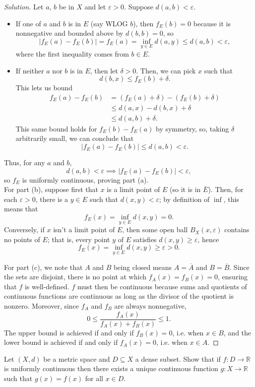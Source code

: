 \documentclass[11pt]{scrartcl}
\providecommand{\ol}{\overline}
\providecommand{\eps}{\varepsilon}
\providecommand{\RR}{\mathbb R}
\providecommand{\ii}{\item}
\newenvironment{soln}{\begin{proof}[Solution]}{\end{proof}}
\begin{document}
\begin{soln}
	Let $a$, $b$ be in $X$ and let $\eps > 0$.
	Suppose $d(a, b) < \eps$.
	\begin{itemize}
		\ii If one of $a$ and $b$ is in $E$ (say WLOG $b$), then
		$f_E(b) = 0$ because it is nonnegative and bounded above by
		$d(b, b) = 0$, so
		\[|f_E(a) - f_E(b)| = f_E(a) =
		\inf_{y\in E} d(a, y) \le d(a, b) < \eps,\]
		where the first inequality comes from $b\in E$.
		\ii If neither $a$ nor $b$ is in $E$, then let $\delta > 0$.
		Then, we can pick $x$ such that
		\[d(b, x) \le f_E(b) + \delta.\]
		This lets us bound
		\begin{align*}
			f_E(a) - f_E(b) &= (f_E(a) + \delta) - (f_E(b) + \delta)\\
			&\le d(a, x) - d(b, x) + \delta\\
			&\le d(a, b) + \delta.
		\end{align*}
		This same bound holds for $f_E(b) - f_E(a)$ by symmetry,
		so, taking $\delta$ arbitrarily small, we can conclude that
		\[|f_E(a) - f_E(b)|\le d(a, b) < \eps.\]
	\end{itemize}
	Thus, for any $a$ and $b$,
	\[d(a, b) < \eps \implies |f_E(a) - f_E(b)| < \eps,\]
	so $f_E$ is uniformly continuous, proving part (a).\\
	
	For part (b), suppose first that $x$ is a limit point of $E$
	(so it is in $\ol E$). Then, for each $\eps > 0$,
	there is a $y\in E$ such that $d(x, y) < \eps$;
	by definition of $\inf$, this means that
	\[f_E(x) = \inf_{y\in E} d(x, y) = 0.\]
	Conversely, if $x$ isn't a limit point of $E$, then
	some open ball $B_X(x, \eps)$ contains no points of $E$;
	that is, every point $y$ of $E$ satisfies
	$d(x, y) \ge \eps$, hence
	\[f_E(x) = \inf_{y\in E} d(x, y) \ge \eps > 0.\]
	
	For part (c), we note that $A$ and $B$ being closed
	means $A = \ol A$ and $B = \ol B$.
	Since the sets are disjoint, there is no point at which
	$f_A(x) = f_B(x) = 0$, ensuring that $f$ is well-defined.
	$f$ must then be continuous
	because sums and quotients of continuous functions are continuous
	as long as the divisor of the quotient is nonzero.	
	Moreover, since $f_A$ and $f_B$ are always nonnegative,
	\[0 \le \frac{f_A(x)}{f_A(x) + f_B(x)} \le 1.\]
	The upper bound is achieved if and only if $f_B(x) = 0$,
	i.e. when $x\in B$, and the lower bound is achieved
	if and only if $f_A(x) = 0$, i.e. when $x\in A$.
\end{soln}

\begin{problem}
	Let $(X, d)$ be a metric space and $D\subseteq X$ a dense subset.
	Show that if $f\colon D\to \RR$ is uniformly continuous
	then there exists a unique continuous function
	$g\colon X\to\RR$ such that $g(x) = f(x)$ for all $x\in D$.
\end{problem}
\end{document}
